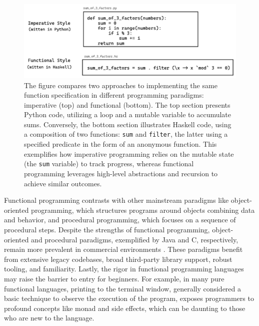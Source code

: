 \begin{figure}[htbp]
  \centering
  \includegraphics[width=\linewidth]{ImperativeFunctional}
  \caption[Comparing two approaches to implementing the same function specification in different programming paradigms: imperative and functional]{
    \label{fig:imperative-vs-functional}
    The figure compares two approaches to implementing the same function specification in different programming paradigms: imperative (top) and functional (bottom). The top section presents Python code, utilizing a loop and a mutable variable to accumulate sums. Conversely, the bottom section illustrates Haskell code, using a composition of two functions: \texttt{sum} and \texttt{filter}, the latter using a specified predicate in the form of an anonymous function. This exemplifies how imperative programming relies on the mutable state (the \texttt{sum} variable) to track progress, whereas functional programming leverages high-level abstractions and recursion to achieve similar outcomes.    
    }
\end{figure}


Functional programming contrasts with other mainstream paradigms like object-oriented programming, which structures programs around objects combining data and behavior, and procedural programming, which focuses on a sequence of procedural steps. Despite the strengths of functional programming, object-oriented and procedural paradigms, exemplified by Java and C, respectively, remain more prevalent in commercial environments \cite{StackOverflow2023-cp, Cass2023-fa}. These paradigms benefit from extensive legacy codebases, broad third-party library support, robust tooling, and familiarity. Lastly, the rigor in functional programming languages may raise the barrier to entry for beginners. For example, in many pure functional languages, printing to the terminal window, generally considered a basic technique to observe the execution of the program, exposes programmers to profound concepts like monad and side effects, which can be daunting to those who are new to the language.  


